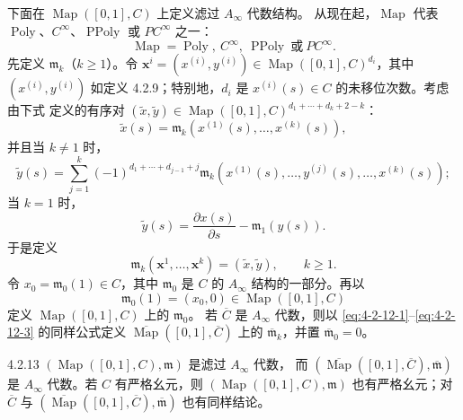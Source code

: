 下面在 $\operatorname{Map}([0,1],C)$ 上定义滤过 $A_\infty$ 代数结构。
从现在起，$\operatorname{Map}$ 代表
$\operatorname{Poly}$、$C^\infty$、$\operatorname{PPoly}$ 或
$PC^\infty$ 之一：
\[
 \operatorname{Map}=\operatorname{Poly},\ C^\infty,
 \ \operatorname{PPoly}\ \text{或}\ PC^\infty.
\]
先定义 $\mathfrak m_k$（$k\geq1$）。令
$\mathbf x^i=(x^{(i)},y^{(i)})\in
\operatorname{Map}([0,1],C)^{d_i}$，其中 $(x^{(i)},y^{(i)})$ 如定义
4.2.9；特别地，$d_i$ 是 $x^{(i)}(s)\in C$ 的未移位次数。考虑由下式
定义的有序对
$(\widetilde x,\widetilde y)\in
\operatorname{Map}([0,1],C)^{d_1+\cdots+d_k+2-k}$：
\[
 \widetilde x(s)=\mathfrak m_k
 (x^{(1)}(s),\ldots,x^{(k)}(s)),
\]
并且当 $k\ne1$ 时，
\begin{equation}
 \widetilde y(s)=\sum_{j=1}^{k}
 (-1)^{d_1+\cdots+d_{j-1}+j}
 \mathfrak m_k(x^{(1)}(s),\ldots,y^{(j)}(s),\ldots,x^{(k)}(s));
\tag{4.2.12.1}\label{eq:4-2-12-1}
\end{equation}
当 $k=1$ 时，
\begin{equation}
 \widetilde y(s)=\frac{\partial x(s)}{\partial s}-\mathfrak m_1(y(s)).
\tag{4.2.12.2}\label{eq:4-2-12-2}
\end{equation}
于是定义
\begin{equation}
 \mathfrak m_k(\mathbf x^1,\ldots,\mathbf x^k)
 =(\widetilde x,\widetilde y),\qquad k\geq1.
\tag{4.2.12.3}\label{eq:4-2-12-3}
\end{equation}
令 $x_0=\mathfrak m_0(1)\in C$，其中 $\mathfrak m_0$ 是 $C$ 的
$A_\infty$ 结构的一部分。再以
\begin{equation}
 \mathfrak m_0(1)=(x_0,0)\in\operatorname{Map}([0,1],C)
\tag{4.2.12.4}\label{eq:4-2-12-4}
\end{equation}
定义 $\operatorname{Map}([0,1],C)$ 上的 $\mathfrak m_0$。
若 $\overline C$ 是 $A_\infty$ 代数，则以
\eqref{eq:4-2-12-1}--\eqref{eq:4-2-12-3} 的同样公式定义
$\overline{\operatorname{Map}}([0,1],\overline C)$ 上的
$\overline{\mathfrak m}_k$，并置 $\overline{\mathfrak m}_0=0$。

\begin{lemma}{4.2.13}\label{lem:4-2-13}
$(\operatorname{Map}([0,1],C),\mathfrak m)$ 是滤过 $A_\infty$ 代数，
而
$(\overline{\operatorname{Map}}([0,1],\overline C),
\overline{\mathfrak m})$ 是 $A_\infty$ 代数。若 $C$ 有严格幺元，则
$(\operatorname{Map}([0,1],C),\mathfrak m)$ 也有严格幺元；对
$\overline C$ 与
$(\overline{\operatorname{Map}}([0,1],\overline C),
\overline{\mathfrak m})$ 也有同样结论。
\end{lemma}

